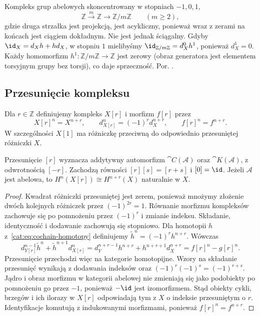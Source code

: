 \begin{przyklad}\label{cat:ex:acyclic-not-contractible}
Kompleks grup abelowych skoncentrowany w stopniach $-1,0,1$,
\[
 \mathbb Z\xrightarrow{m}\mathbb Z\longrightarrow\mathbb Z/m\mathbb Z
 \qquad(m\ge2),
\]
gdzie druga strzałka jest projekcją, jest acykliczny, ponieważ wraz z zerami na końcach jest ciągiem dokładnym. Nie jest jednak ściągalny. Gdyby $\id_X=d_Xh+hd_X$, w stopniu $1$ mielibyśmy $\id_{\mathbb Z/m\mathbb Z}=d_X^0h^1$, ponieważ $d_X^1=0$. Każdy homomorfizm $h^1:\mathbb Z/m\mathbb Z\to\mathbb Z$ jest zerowy (obraz generatora jest elementem torsyjnym grupy bez torsji), co daje sprzeczność. Por. .
\end{przyklad}

\subsection{Przesunięcie kompleksu}
\begin{definicja}\label{cat:def:complex-shift}
Dla $r\in\mathbb Z$ definiujemy kompleks $X[r]$ i morfizm $f[r]$ przez
\[
 X[r]^n=X^{n+r},\qquad d_{X[r]}^n=(-1)^r d_X^{n+r},
 \qquad f[r]^n=f^{n+r}.
\]
W szczególności $X[1]$ ma różniczkę przeciwną do odpowiednio przesuniętej różniczki $X$.
\end{definicja}
\begin{stwierdzenie}\label{cat:prop:shift-functor}
Przesunięcie $[r]$ wyznacza addytywny automorfizm $\cat{C}(\mathcal A)$ oraz $\cat{K}(\mathcal A)$, z odwrotnością $[-r]$. Zachodzą równości $[r][s]=[r+s]$ i $[0]=\id$. Jeżeli $\mathcal A$ jest abelowa, to $H^n(X[r])\cong H^{n+r}(X)$ naturalnie w $X$.
\end{stwierdzenie}
\begin{proof}
Kwadrat różniczki przesuniętej jest zerem, ponieważ mnożymy złożenie dwóch kolejnych różniczek przez $(-1)^{2r}=1$. Równanie morfizmu kompleksów zachowuje się po pomnożeniu przez $(-1)^r$ i zmianie indeksu. Składanie, identyczność i dodawanie zachowują się stopniowo. Dla homotopii $h$ z~\eqref{cat:eq:cochain-homotopy} definiujemy $\widetilde h^n=(-1)^r h^{n+r}$. Wówczas
\[
 d_{Y[r]}^{n-1}\widetilde h^n+\widetilde h^{n+1}d_{X[r]}^n
 =d_Y^{n+r-1}h^{n+r}+h^{n+r+1}d_X^{n+r}
 =f[r]^n-g[r]^n.
\]
Przesunięcie przechodzi więc na kategorie homotopijne. Wzory na składanie przesunięć wynikają z dodawania indeksów oraz $(-1)^r(-1)^s=(-1)^{r+s}$. Jądro i obraz morfizmu w kategorii abelowej nie zmieniają się jako podobiekty po pomnożeniu go przez $-1$, ponieważ $-\id$ jest izomorfizmem. Stąd obiekty cykli, brzegów i ich ilorazy w $X[r]$ odpowiadają tym z $X$ o indeksie przesuniętym o $r$. Identyfikacje komutują z indukowanymi morfizmami, ponieważ $f[r]^n=f^{n+r}$.
\end{proof}

